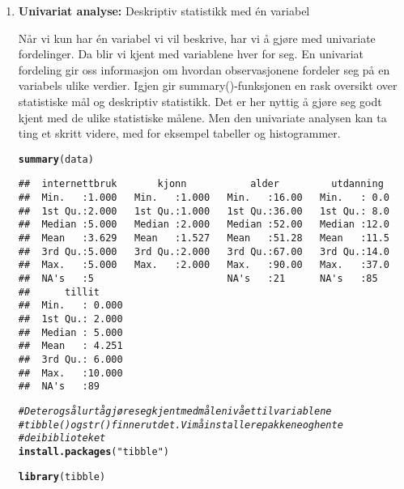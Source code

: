 \documentclass[a4 paper, 12pt]{article}\usepackage[]{graphicx}\usepackage[]{color}
\makeatletter
\newcommand{\hlstr}[1]{\textcolor[rgb]{0.192,0.494,0.8}{#1}}%
\newcommand{\hlcom}[1]{\textcolor[rgb]{0.678,0.584,0.686}{\textit{#1}}}%
\newcommand{\hlstd}[1]{\textcolor[rgb]{0.345,0.345,0.345}{#1}}%
\newcommand{\hlkwd}[1]{\textcolor[rgb]{0.737,0.353,0.396}{\textbf{#1}}}%
\newenvironment{kframe}{%
 \def\at@end@of@kframe{}%
 \ifinner\ifhmode%
  \def\at@end@of@kframe{\end{minipage}}%
  \begin{minipage}{\columnwidth}%
 \fi\fi%
 \def\FrameCommand##1{\hskip\@totalleftmargin \hskip-\fboxsep
 \colorbox{shadecolor}{##1}\hskip-\fboxsep
     \hskip-\linewidth \hskip-\@totalleftmargin \hskip\columnwidth}%
 \MakeFramed {\advance\hsize-\width
   \@totalleftmargin\z@ \linewidth\hsize
   \@setminipage}}%
 {\par\unskip\endMakeFramed%
 \at@end@of@kframe}
\newenvironment{knitrout}{}{} %
\makeatother
\begin{document}
\begin{enumerate}
         \item \textbf{Univariat analyse:} Deskriptiv statistikk med én variabel
       
       Når vi kun har én variabel vi vil beskrive, har vi å gjøre med univariate fordelinger. Da blir vi kjent med variablene hver for seg. En univariat fordeling gir oss informasjon om hvordan observasjonene fordeler seg på en variabels ulike verdier. Igjen gir summary()-funksjonen en rask oversikt over statistiske mål og deskriptiv statistikk. Det  er her nyttig å gjøre seg godt kjent med de ulike statistiske målene. Men den univariate analysen kan ta ting et skritt videre, med for eksempel tabeller og histogrammer. 
       
\begin{knitrout}\footnotesize
{}\color{fgcolor}\begin{kframe}
\begin{alltt}
  \hlkwd{summary}\hlstd{(data)}
\end{alltt}
\begin{verbatim}
##  internettbruk       kjonn           alder         utdanning   
##  Min.   :1.000   Min.   :1.000   Min.   :16.00   Min.   : 0.0  
##  1st Qu.:2.000   1st Qu.:1.000   1st Qu.:36.00   1st Qu.: 8.0  
##  Median :5.000   Median :2.000   Median :52.00   Median :12.0  
##  Mean   :3.629   Mean   :1.527   Mean   :51.28   Mean   :11.5  
##  3rd Qu.:5.000   3rd Qu.:2.000   3rd Qu.:67.00   3rd Qu.:14.0  
##  Max.   :5.000   Max.   :2.000   Max.   :90.00   Max.   :37.0  
##  NA's   :5                       NA's   :21      NA's   :85    
##      tillit      
##  Min.   : 0.000  
##  1st Qu.: 2.000  
##  Median : 5.000  
##  Mean   : 4.251  
##  3rd Qu.: 6.000  
##  Max.   :10.000  
##  NA's   :89
\end{verbatim}
\begin{alltt}
\hlcom{# Det er også lurt å gjøre seg kjent med målenivået til variablene}
\hlcom{# tibble() og str() finner ut det. Vi må installere pakkene og hente}
\hlcom{# de i biblioteket}
\hlkwd{install.packages}\hlstd{(}\hlstr{"tibble"}\hlstd{)}
\end{alltt}


{\ttfamily\noindent\bfseries{}}\begin{alltt}
\hlkwd{library}\hlstd{(tibble)}


\end{alltt}
\end{kframe}
\end{knitrout}
\end{enumerate}
\end{document}
